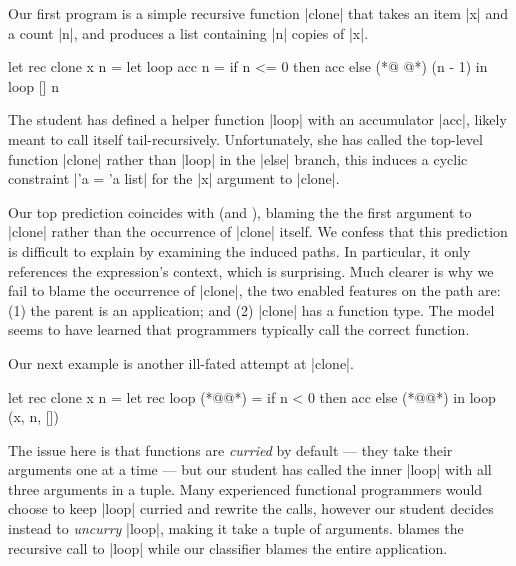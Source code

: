Our first program is a simple recursive function |clone| that takes an
item |x| and a count |n|, and produces a list containing |n| copies of
|x|.
%
\begin{ecode}
  let rec clone x n =
    let loop acc n =
      if n <= 0 then
        acc
      else
        (*@ @*) (n - 1) in
    loop [] n
\end{ecode}
%
The student has defined a helper function |loop| with an accumulator
|acc|, likely meant to call itself tail-recursively.
%
Unfortunately, she has called the top-level function |clone| rather than
|loop| in the |else| branch, this induces a cyclic constraint |'a = 'a list|
for the |x| argument to |clone|.

Our top prediction coincides with \sherrloc (and \ocaml), blaming the
the first argument to |clone| rather than the occurrence of |clone| itself.
%
%
We confess that this prediction is difficult to explain by
examining the induced paths.
%
In particular, it only references the expression's context,
which is surprising.
%
Much clearer is why we fail to blame the occurrence of |clone|, the two
enabled features on the path are:
%
(1) the parent is an application; and
%
(2) |clone| has a function type.
%
The model seems to have learned that programmers typically call the
correct function.

Our next example is another ill-fated attempt at |clone|.
%
\begin{ecode}
  let rec clone x n =
    let rec loop (*@@*) =
      if n < 0 then
        acc
      else
        (*@@*) in
    loop (x, n, [])
\end{ecode}
%
The issue here is that \ocaml functions are \emph{curried} by default
--- \ie they take their arguments one at a time --- but our student has
called the inner |loop| with all three arguments in a tuple.
%
Many experienced functional programmers would choose to keep |loop|
curried and rewrite the calls, however our student decides instead to
\emph{uncurry} |loop|, making it take a tuple of arguments.
%
\sherrloc blames the recursive call to |loop| while our classifier
blames the entire application.

